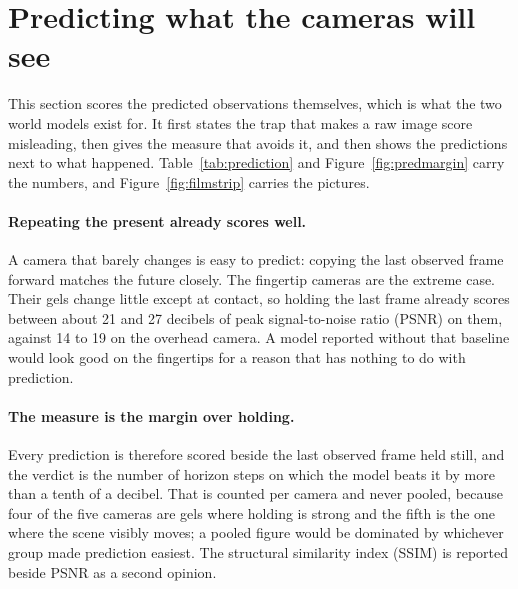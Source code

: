 \section{Predicting what the cameras will see}
\label{sec:prediction}

This section scores the predicted observations themselves, which is what the
two world models exist for. It first states the trap that makes a raw image
score misleading, then gives the measure that avoids it, and then shows the
predictions next to what happened. Table~\ref{tab:prediction} and
Figure~\ref{fig:predmargin} carry the numbers, and
Figure~\ref{fig:filmstrip} carries the pictures.

\paragraph{Repeating the present already scores well.}
A camera that barely changes is easy to predict: copying the last observed
frame forward matches the future closely. The fingertip cameras are the extreme
case. Their gels change little except at contact, so holding the last frame
already scores between about \num{21} and \num{27} decibels of peak
signal-to-noise ratio (PSNR) on them, against \num{14} to \num{19} on the
overhead camera.
A model reported without that baseline would look good on the fingertips for a
reason that has nothing to do with prediction.

\paragraph{The measure is the margin over holding.}
Every prediction is therefore scored beside the last observed frame held
still, and the verdict is the number of horizon steps on which the model beats
it by more than a tenth of a decibel. That is counted per camera and never
pooled, because four of the five cameras are gels where holding is strong and
the fifth is the one where the scene visibly moves; a pooled figure would be
dominated by whichever group made prediction easiest. The structural similarity
index (SSIM) is reported beside PSNR as a second opinion.

\begin{table}[t]
  \centering
  \caption{Future-observation prediction on the seven held-back recordings.
  \emph{Held} is the last observed frame repeated at every step. \emph{Steps
  won} counts the horizon steps, each \SI{0.8}{\second} apart, on which the
  model's PSNR exceeds holding by more than a tenth of a decibel. The two
  models' steps are not the same length: the small model's are
  \SI{0.8}{\second} apart, the large model's about \SI{0.13}{\second}, so
  step counts compare within a row and never between models. The large model
  reads the four fingertips as one composite image.}
  \label{tab:prediction}
  \small
  
\end{table}

